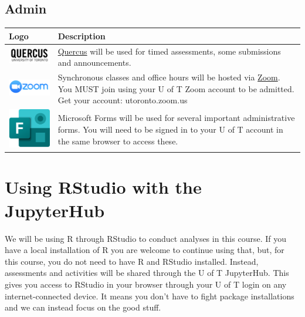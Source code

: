 \documentclass[
]{book}
\begin{document}
\hypertarget{admin}{%
\subsection{Admin}\label{admin}}

\begin{longtable}[]{@{}
  >{\centering\arraybackslash}p{}
  >{\centering\arraybackslash}p{}@{}}
\toprule
Logo & Description \\
\midrule
\endhead
\includegraphics{images/course-tools/quercus.jpg} & \href{https://q.utoronto.ca/}{Quercus}
will be used for timed
assessments, some submissions
and announcements. \\
\includegraphics{images/course-tools/zoom.png} & Synchronous classes and office
hours will be hosted via
\href{https://utoronto.zoom.us}{Zoom}.
You MUST join using your U of
T Zoom account to be admitted.
Get your account:
utoronto.zoom.us \\
\includegraphics{images/course-tools/forms.png} & Microsoft Forms will be used
for several important
administrative forms. You will
need to be signed in to your U
of T account in the same
browser to access these. \\
\bottomrule
\end{longtable}

\hypertarget{using-rstudio-with-the-jupyterhub}{%
\section{Using RStudio with the JupyterHub}\label{using-rstudio-with-the-jupyterhub}}

We will be using R through RStudio to conduct analyses in this course. If you have a local installation of R you are welcome to continue using that, but, for this course, you do not need to have R and RStudio installed. Instead, assessments and activities will be shared through the U of T JupyterHub. This gives you access to RStudio in your browser through your U of T login on any internet-connected device. It means you don't have to fight package installations and we can instead focus on the good stuff.
\end{document}
